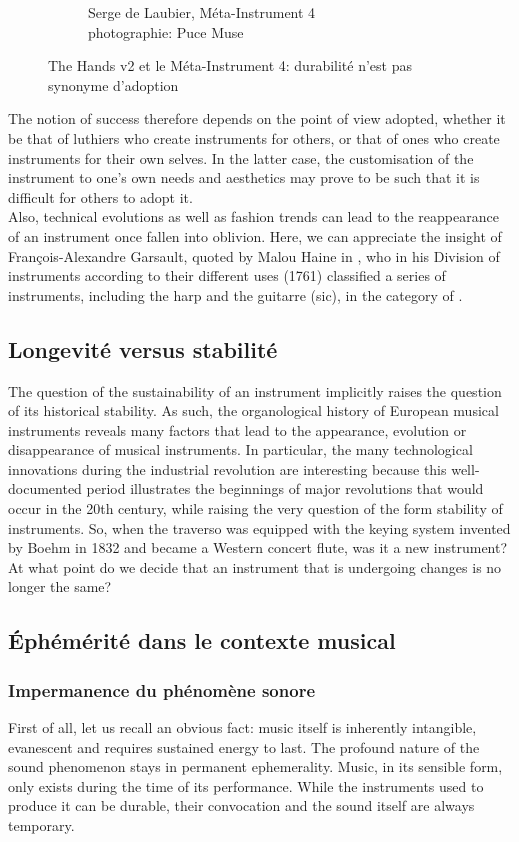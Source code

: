 \begin{figure}[!htbp]
{\begin{subfigure}[b]{.5\textwidth}
			\caption{Serge de Laubier, Méta-Instrument 4\\ photographie: Puce Muse}
		\end{subfigure}%
	}
	\caption{The Hands v2 et le Méta-Instrument 4: durabilité n'est pas synonyme d'adoption}
\end{figure}

\indent The notion of success therefore depends on the point of view adopted, whether it be that of luthiers who create instruments for others, or that of ones who create instruments for their own selves. In the latter case, the customisation of the instrument to one's own needs and aesthetics may prove to be such that it is difficult for others to adopt it.\\
\indent Also, technical evolutions as well as fashion trends can lead to the reappearance of an instrument once fallen into oblivion. Here, we can appreciate the insight of François-Alexandre Garsault, quoted by Malou Haine in \cite{haine_les_2018}, who in his Division of instruments according to their different uses (1761) classified a series of instruments, including the harp and the guitarre (sic), in the category of .

\subsection{Longevité versus stabilité}
\label{sec:ephemeral:longevity_stability}
The question of the sustainability of an instrument implicitly raises the question of its historical stability. As such, the organological history of European musical instruments reveals many factors that lead to the appearance, evolution or disappearance of musical instruments. In particular, the many technological innovations during the industrial revolution are interesting because this well-documented period illustrates the beginnings of major revolutions that would occur in the 20th century, while raising the very question of the form stability of instruments. So, when the traverso was equipped with the keying system invented by Boehm in 1832 and became a Western concert flute, was it a new instrument? At what point do we decide that an instrument that is undergoing changes is no longer the same?

\subsection{Éphémérité dans le contexte musical}
\subsubsection{Impermanence du phénomène sonore}
\noindent First of all, let us recall an obvious fact: music itself is inherently intangible, evanescent and requires sustained energy to last. The profound nature of the sound phenomenon stays in permanent ephemerality. Music, in its sensible form, only exists during the time of its performance. While the instruments used to produce it can be durable, their convocation and the sound itself are always temporary. 

